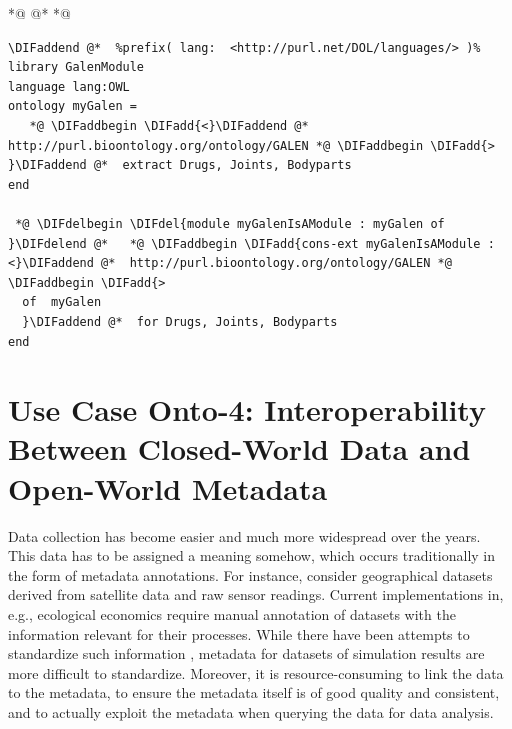 \documentclass[10pt,fleqn,final]{scrreprt}
\newenvironment{definitions}[0]{\medskip }{}
\providecommand{\DIFadd}[1]{{\protect\color{blue}\uwave{#1}}} %
\providecommand{\DIFdel}[1]{{\protect\color{red}\sout{#1}}}                      %
\providecommand{\DIFaddbegin}{} %
\providecommand{\DIFaddend}{} %
\providecommand{\DIFdelbegin}{} %
\providecommand{\DIFdelend}{} %
\begin{document}
\begin{definitions}
 *@ \DIFdelbegin %
\DIFdelend @*   *@ \DIFaddbegin \begin{lstlisting}[basicstyle=\ttfamily,language=dolText,escapechar=@,mathescape]
\DIFaddend @*  %prefix( lang:  <http://purl.net/DOL/languages/> )%
library GalenModule
language lang:OWL
ontology myGalen = 
   *@ \DIFaddbegin \DIFadd{<}\DIFaddend @*  http://purl.bioontology.org/ontology/GALEN *@ \DIFaddbegin \DIFadd{> }\DIFaddend @*  extract Drugs, Joints, Bodyparts
end

 *@ \DIFdelbegin \DIFdel{module myGalenIsAModule : myGalen of }\DIFdelend @*   *@ \DIFaddbegin \DIFadd{cons-ext myGalenIsAModule : <}\DIFaddend @*  http://purl.bioontology.org/ontology/GALEN *@ \DIFaddbegin \DIFadd{>
  of  myGalen 
  }\DIFaddend @*  for Drugs, Joints, Bodyparts
end
\end{lstlisting}



\section{Use Case Onto-4: Interoperability Between Closed-World Data and Open-World Metadata}
Data collection has become easier and much more widespread over the years. This data has to be 
assigned a meaning somehow, which occurs traditionally in the  form of metadata annotations. For 
instance, consider geographical datasets derived from satellite data and raw sensor readings. 
Current implementations in, e.g., ecological economics \cite{bagstad_aries_2011} require manual 
annotation of datasets with the information relevant for their processes. While there have been 
attempts to standardize such information \cite{european_comission_inspire_2014}, metadata for 
datasets of simulation results are more difficult to standardize. Moreover, it is 
resource-consuming to link the data to the metadata, to ensure the metadata itself is of good 
quality and consistent, and to actually exploit the metadata when querying the data for data 
analysis. 


\end{definitions}
\end{document}
